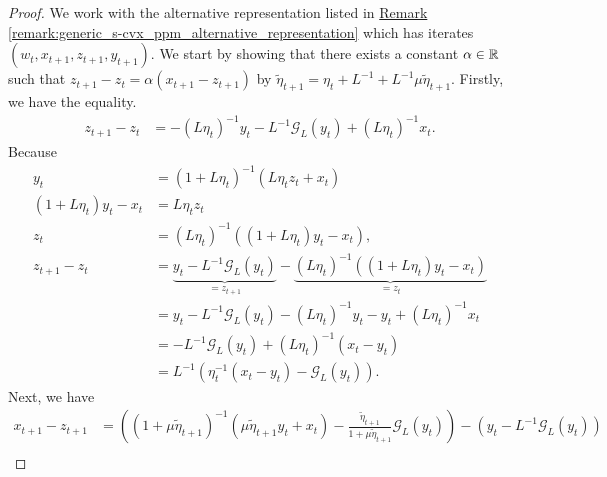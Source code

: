 \documentclass[12pt]{article}
\begin{document}
        \begin{proof}
            We work with the alternative representation listed in 
            \hyperref[remark:generic_s-cvx_ppm_alternative_representation]
            {Remark \ref*{remark:generic_s-cvx_ppm_alternative_representation}} which has iterates $(w_t, x_{t + 1}, z_{t + 1}, y_{t + 1})$. 
            We start by showing that there exists a constant $\alpha \in \mathbb R$ such that $z_{t + 1} - z_t = \alpha (x_{t + 1} - z_{t + 1})$ by $\tilde \eta_{t + 1} = \eta_t + L^{-1} + L^{-1} \mu \tilde \eta_{t + 1}$. 
            Firstly, we have the equality. 
            \begin{align*}
                z_{t + 1} - z_t
                &= 
                - (L\eta_t)^{-1} y_t 
                - L^{-1}\mathcal G_L(y_t) + (L \eta_t)^{-1} x_t. 
            \end{align*}
            Because 
            \begin{align*}
                y_{t} &= (1 + L\eta_{t})^{-1}(L\eta_{t}z_{t} + x_{t})
                \\
                (1 + L\eta_t)y_t - x_t &= L\eta_t z_t
                \\
                z_t & = (L\eta_t)^{-1}((1 + L\eta_t)y_t - x_t), 
                \\[1em]
                z_{t + 1} - z_t 
                &= \underbrace{ y_t - L^{-1}\mathcal G_L(y_t)}_{=z_{t + 1}}
                - \underbrace{(L\eta_t)^{-1}((1 + L\eta_t)y_t - x_t)}_{=z_t}
                \\
                &= 
                y_t - L^{-1} \mathcal G_L(y_t) - (L\eta_t)^{-1}y_t - y_t + (L\eta_t)^{-1} x_t
                \\
                &= 
                -L^{-1}\mathcal G_L(y_t) + (L\eta_t)^{-1}(x_t - y_t)
                \\
                &= 
                L^{-1}(\eta_t^{-1}(x_t - y_t) -\mathcal G_L(y_t)). 
            \end{align*}
            Next, we have 
            \begin{align*}
                x_{t + 1} - z_{t + 1}&= 
                \left(
                    (1 + \mu \tilde \eta_{t+ 1})^{-1} (\mu \tilde \eta_{t + 1}y_t + x_t)
                    - \frac{\tilde \eta_{t + 1}}{1 + \mu\tilde \eta_{t + 1}}
                    \mathcal G_L(y_t)
                \right) - \left(
                    y_t - L^{-1}\mathcal G_L(y_t)
                \right)
                \\

\end{align*}
\end{proof}
\end{document}
